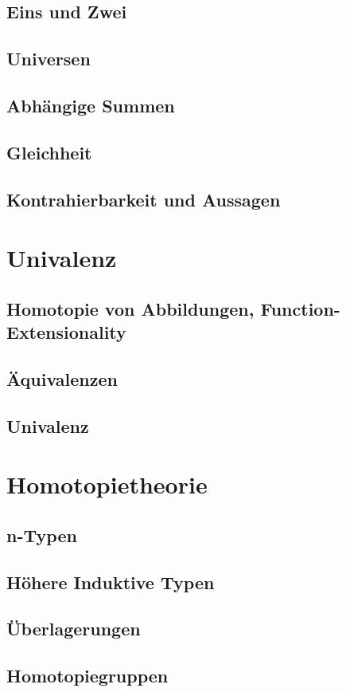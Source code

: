 \documentclass[a4paper,12pt]{article}
\theoremstyle{break}
\theoremstyle{nonumberbreak}
\theoremstyle{nonumberplain}
\begin{document}
\subsection{Eins und Zwei}
\subsection{Universen}
\subsection{Abhängige Summen}
\subsection{Gleichheit}
\subsection{Kontrahierbarkeit und Aussagen}

\section{Univalenz}
\subsection{Homotopie von Abbildungen, Function-Extensionality}
\subsection{Äquivalenzen}
\subsection{Univalenz}

\section{Homotopietheorie}
\subsection{n-Typen}
\subsection{Höhere Induktive Typen}
\subsection{Überlagerungen}
\subsection{Homotopiegruppen}
\end{document}
